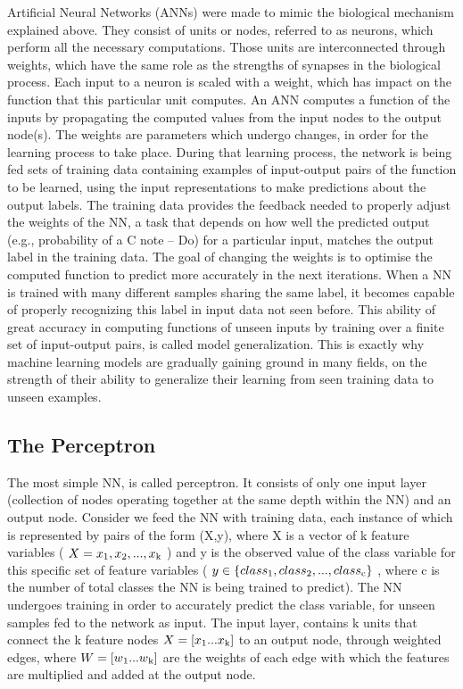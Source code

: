     Artificial Neural Networks (ANNs) were made to mimic the biological mechanism explained above. They consist of units or nodes, referred to as neurons, which perform all the necessary computations. Those units are interconnected through weights, which have the same role as the strengths of synapses in the biological process. Each input to a neuron is scaled with a weight, which has impact on the function that this particular unit computes. An ANN computes a function of the inputs by propagating the computed values from the input nodes to the output node(s). The weights are parameters which undergo changes, in order for the learning process to take place. During that learning process, the network is being fed sets of training data containing examples of input-output pairs of the function to be learned, using the input representations to make predictions about the output labels. The training data provides the feedback needed to properly adjust the weights of the NN, a task that depends on how well the predicted output (e.g., probability of a C note -- Do) for a particular input, matches the output label in the training data. The goal of changing the weights is to optimise the computed function to predict more accurately in the next iterations. When a NN is trained with many different samples sharing the same label, it becomes capable of properly recognizing this label in input data not seen before. This ability of great accuracy in computing functions of unseen inputs by training over a finite set of input-output pairs, is called model generalization. This is exactly why machine learning models are gradually gaining ground in many fields, on the strength of their ability to generalize their learning from seen training data to unseen examples.
    
    \subsection{The Perceptron} \label{subsec:perceptron}
    The most simple NN, is called perceptron. It consists of only one input layer (collection of nodes operating together at the same depth within the NN) and an output node. Consider we feed the ΝΝ with training data, each instance of which is represented by pairs of the form (X,y), where X is a vector of k feature variables ( $X =  x\textsubscript{1}, x\textsubscript{2},...,x\textsubscript{k}$ ) and y is the observed value of the class variable for this specific set of feature variables ( $y \in \{class\textsubscript{1}, class\textsubscript{2},...,class\textsubscript{c}\}$ , where c is the number of total classes the NN is being trained to predict). The NN undergoes training in order to accurately predict the class variable, for unseen samples fed to the network as input. 
    The input layer, contains k units that connect the k feature nodes $X = [x\textsubscript{1}...x\textsubscript{k}]$ to an output node, through weighted edges, where $W = [w\textsubscript{1}...w\textsubscript{k}]$ are the weights of each edge with which the features are multiplied and added at the output node. 

